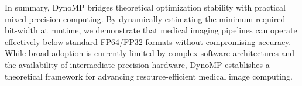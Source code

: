 \documentclass[runningheads]{llncs}
\begin{document}
In summary, DynoMP bridges theoretical optimization stability with practical mixed precision computing. By dynamically estimating the minimum required bit-width at runtime, we demonstrate that medical imaging pipelines can operate effectively below standard FP64/FP32 formats without compromising accuracy. While broad adoption is currently limited by complex software architectures and the availability of intermediate-precision hardware, DynoMP establishes a theoretical framework for advancing resource-efficient medical image computing.

%

\newpage


\end{document}
